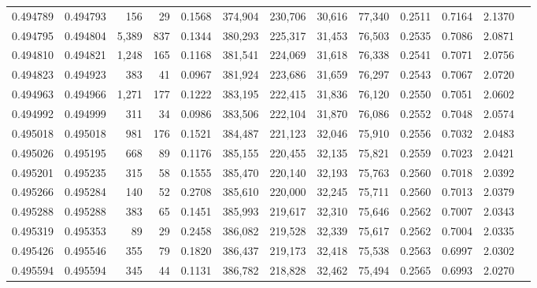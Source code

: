 \begin{tabular}{rrrrrrrrrrrrr}
0.494789 & 0.494793 &   156 &    29 &                                     0.1568 & 374,904 & 230,706 &  30,616 &  77,340 & 0.2511 & 0.7164 & 2.1370 \\
0.494795 & 0.494804 & 5,389 &   837 &                                     0.1344 & 380,293 & 225,317 &  31,453 &  76,503 & 0.2535 & 0.7086 & 2.0871 \\
0.494810 & 0.494821 & 1,248 &   165 &                                     0.1168 & 381,541 & 224,069 &  31,618 &  76,338 & 0.2541 & 0.7071 & 2.0756 \\
0.494823 & 0.494923 &   383 &    41 &                                     0.0967 & 381,924 & 223,686 &  31,659 &  76,297 & 0.2543 & 0.7067 & 2.0720 \\
0.494963 & 0.494966 & 1,271 &   177 &                                     0.1222 & 383,195 & 222,415 &  31,836 &  76,120 & 0.2550 & 0.7051 & 2.0602 \\
0.494992 & 0.494999 &   311 &    34 &                                     0.0986 & 383,506 & 222,104 &  31,870 &  76,086 & 0.2552 & 0.7048 & 2.0574 \\
0.495018 & 0.495018 &   981 &   176 &                                     0.1521 & 384,487 & 221,123 &  32,046 &  75,910 & 0.2556 & 0.7032 & 2.0483 \\
0.495026 & 0.495195 &   668 &    89 &                                     0.1176 & 385,155 & 220,455 &  32,135 &  75,821 & 0.2559 & 0.7023 & 2.0421 \\
0.495201 & 0.495235 &   315 &    58 &                                     0.1555 & 385,470 & 220,140 &  32,193 &  75,763 & 0.2560 & 0.7018 & 2.0392 \\
0.495266 & 0.495284 &   140 &    52 &                                     0.2708 & 385,610 & 220,000 &  32,245 &  75,711 & 0.2560 & 0.7013 & 2.0379 \\
0.495288 & 0.495288 &   383 &    65 &                                     0.1451 & 385,993 & 219,617 &  32,310 &  75,646 & 0.2562 & 0.7007 & 2.0343 \\
0.495319 & 0.495353 &    89 &    29 &                                     0.2458 & 386,082 & 219,528 &  32,339 &  75,617 & 0.2562 & 0.7004 & 2.0335 \\
0.495426 & 0.495546 &   355 &    79 &                                     0.1820 & 386,437 & 219,173 &  32,418 &  75,538 & 0.2563 & 0.6997 & 2.0302 \\
0.495594 & 0.495594 &   345 &    44 &                                     0.1131 & 386,782 & 218,828 &  32,462 &  75,494 & 0.2565 & 0.6993 & 2.0270 \\

\end{tabular}
